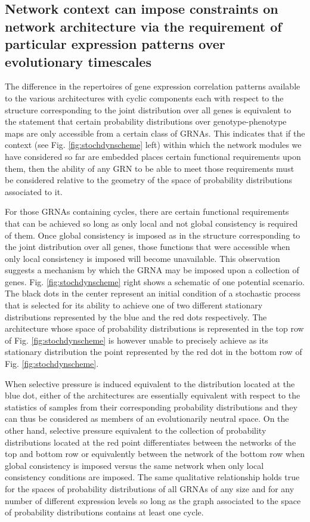 \subsection*{Network context can impose constraints on network architecture via the requirement of particular expression patterns over evolutionary timescales}

The difference in the repertoires of gene expression correlation patterns available to the various architectures with cyclic components each with respect to the structure corresponding to the joint distribution over all genes is equivalent to the statement that certain probability distributions over genotype-phenotype maps are only accessible from a certain class of GRNAs. This indicates that if the context (see Fig. \ref{fig:stochdynscheme} left) within which the network modules we have considered so far are embedded places certain functional requirements upon them, then the ability of any GRN to be able to meet those requirements must be considered relative to the geometry of the space of probability distributions associated to it.

For those GRNAs containing cycles, there are certain functional requirements that can be achieved so long as only local and not global consistency is required of them. Once global consistency is imposed as in the structure corresponding to the joint distribution over all genes, those functions that were accessible when only local consistency is imposed will become unavailable. This observation suggests a mechanism by which the GRNA may be imposed upon a collection of genes. Fig. \ref{fig:stochdynscheme} right shows a schematic of one potential scenario. The black dots in the center represent an initial condition of a stochastic process that is selected for its ability to achieve one of two different stationary distributions represented by the blue and the red dots respectively. The architecture whose space of probability distributions is represented in the top row of Fig. \ref{fig:stochdynscheme} is however unable to precisely achieve as its stationary distribution the point represented by the red dot in the bottom row of Fig. \ref{fig:stochdynscheme}.

When selective pressure is induced equivalent to the distribution located at the blue dot, either of the architectures are essentially equivalent with respect to the statistics of samples from their corresponding probability distributions and they can thus be considered as members of an evolutionarily neutral space. On the other hand, selective pressure equivalent to the collection of probability distributions located at the red point differentiates between the networks of the top and bottom row or equivalently between the network of the bottom row when global consistency is imposed versus the same network when only local consistency conditions are imposed. The same qualitative relationship holds true for the spaces of probability distributions of all GRNAs of any size and for any number of different expression levels so long as the graph associated to the space of probability distributions contains at least one cycle.
